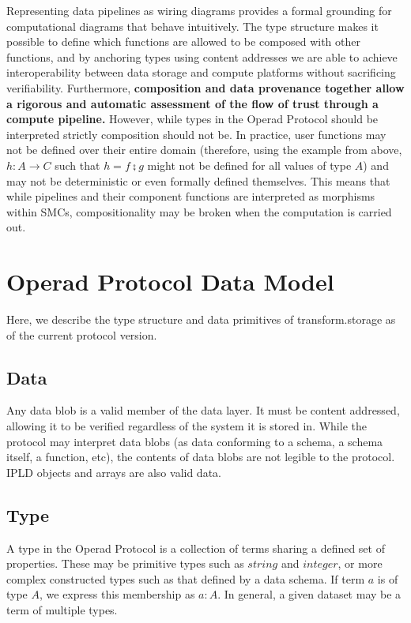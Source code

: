 \documentclass[9pt, oneside]{article}   	%
\begin{document}
Representing data pipelines as wiring diagrams provides a formal grounding for computational diagrams that behave intuitively. The type structure makes it possible to define which functions are allowed to be composed with other functions, and by anchoring types using content addresses we are able to achieve interoperability between data storage and compute platforms without sacrificing verifiability. Furthermore, \textbf{composition and data provenance together allow a rigorous and automatic assessment of the flow of trust through a compute pipeline.}  However, while types in the Operad Protocol should be interpreted strictly composition should not be. In practice, user functions may not be defined over their entire domain (therefore, using the example from above, $h : A \rightarrow C$ such that $h = f \zcmp g$ might not be defined for all values of type $A$) and may not be deterministic or even formally defined themselves. This means that while pipelines and their component functions are interpreted as morphisms within SMCs, compositionality may be broken when the computation is carried out. 



\section{Operad Protocol Data Model}\label{transformtypes}

Here, we describe the type structure and data primitives of transform.storage as of the current protocol version.

\subsection{Data}\label{data}

Any data blob is a valid member of the data layer. It must be content addressed, allowing it to be verified regardless of the system it is stored in. While the protocol may interpret data blobs (as data conforming to a schema, a schema itself, a function, etc), the contents of data blobs are not legible to the protocol. IPLD objects and arrays are also valid data.

\subsection{Type}\label{type}

A type in the Operad Protocol is a collection of terms sharing a defined set of properties. These may be primitive types such as $string$ and $integer$, or more complex constructed types such as that defined by a data schema. If term $a$ is of type $A$, we express this membership as $a:A$. In general, a given dataset may be a term of multiple types.
\end{document}
